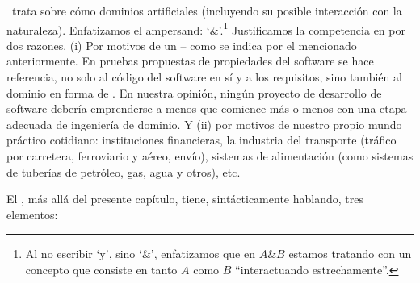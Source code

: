 \begynd
\pind  {} \manual\ trata sobre cómo  dominios artificiales
      (incluyendo su posible interacción con la naturaleza).
      \pind Enfatizamos el ampersand: `\&'.\footnote{Al no escribir `y', sino `\&', enfatizamos que en
      ${A\&B}$ estamos tratando con un  concepto que consiste en
      tanto $A$ como $B$ ``interactuando estrechamente''.}
\pind Justificamos la competencia en 
      por dos razones.
\begynd
\pind (i) Por motivos de un  -- como se indica por el  mencionado anteriormente. En  %
      pruebas propuestas de propiedades del software se hace referencia, no
      solo al código del software en sí y a los requisitos, sino también
      al dominio en forma de . En nuestra opinión, ningún proyecto de desarrollo de software debería
      emprenderse a menos que comience más o menos con una etapa adecuada de ingeniería
      de dominio. Y
\pind (ii) por motivos de  nuestro propio
      mundo práctico cotidiano: instituciones financieras, la industria del transporte
      (tráfico por carretera, ferroviario y aéreo, envío), sistemas de alimentación
      (como sistemas de tuberías de petróleo, gas, agua y otros), etc.
\afslut
\afslut


\label{sec:Structure}

\begynd
\pind El \manual, más allá del presente capítulo, tiene, sintácticamente
hablando, tres elementos:
\afslut

